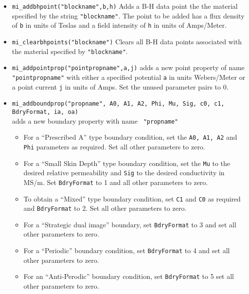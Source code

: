 \begin{itemize}
\item{\tt mi\_addbhpoint("blockname",b,h)} Adds a B-H data point the
the material specified by the string {\tt "blockname"}.  The point to be added
has a flux density of {\tt b} in units of Teslas and a field
intensity of {\tt h} in units of Amps/Meter.

\item{\tt mi\_clearbhpoints("blockname")} Clears all B-H data points
associated with the material specified by {\tt "blockname"}.

\item{\tt mi\_addpointprop("pointpropname",a,j)}
adds a new point property of name {\tt "pointpropname"} with either
a specified potential {\tt a} in units Webers/Meter
or a point current {\tt j} in units of Amps. Set the
unused parameter pairs to 0.

\item{\tt mi\_addboundprop("propname", A0, A1, A2, Phi, Mu, Sig, c0, c1,
BdryFormat, ia, oa)} \\ adds a new boundary property with name {\tt
"propname"}
        \begin{itemize}
        \item For a ``Prescribed A'' type boundary condition, set the {\tt A0,
        A1, A2} and {\tt Phi} parameters as required. Set all other
        parameters to zero.

        \item For a ``Small Skin Depth'' type boundary condition, set the {\tt Mu}
        to the desired relative permeability and {\tt Sig} to the desired
        conductivity in MS/m.  Set {\tt BdryFormat} to 1 and all other
        parameters to zero.

        \item To obtain a ``Mixed'' type boundary condition, set {\tt C1} and
        {\tt C0} as required and {\tt BdryFormat} to 2.  Set all other
        parameters to zero.

        \item For a ``Strategic dual image'' boundary, set {\tt BdryFormat} to 3
        and set all other parameters to zero.

        \item For a ``Periodic'' boundary condition, set {\tt BdryFormat} to 4 and
        set all other parameters to zero.

        \item For an ``Anti-Perodic'' boundary condition, set {\tt BdryFormat} to
        5 set all other parameters to zero.
        

\end{itemize}
\end{itemize}
